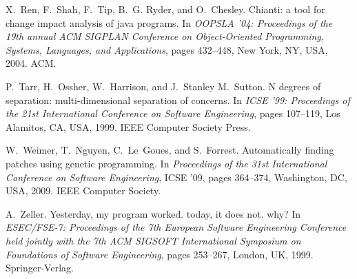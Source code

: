 {\begin{minipage}{0.9\textwidth}
X.~Ren, F.~Shah, F.~Tip, B.~G. Ryder, and O.~Chesley.
\newblock Chianti: a tool for change impact analysis of java programs.
\newblock In {\em OOPSLA '04: Proceedings of the 19th annual ACM SIGPLAN
  Conference on Object-Oriented Programming, Systems, Languages, and
  Applications}, pages 432--448, New York, NY, USA, 2004. ACM.

P.~Tarr, H.~Ossher, W.~Harrison, and J.~Stanley M.~Sutton.
\newblock N degrees of separation: multi-dimensional separation of concerns.
\newblock In {\em ICSE '99: Proceedings of the 21st International Conference on
  Software Engineering}, pages 107--119, Los Alamitos, CA, USA, 1999. IEEE
  Computer Society Press.

W.~Weimer, T.~Nguyen, C.~Le~Goues, and S.~Forrest.
\newblock Automatically finding patches using genetic programming.
\newblock In {\em Proceedings of the 31st International Conference on Software
  Engineering}, ICSE '09, pages 364--374, Washington, DC, USA, 2009. IEEE
  Computer Society.

A.~Zeller.
\newblock Yesterday, my program worked. today, it does not. why?
\newblock In {\em ESEC/FSE-7: Proceedings of the 7th European Software
  Engineering Conference held jointly with the 7th ACM SIGSOFT International
  Symposium on Foundations of Software Engineering}, pages 253--267, London,
  UK, 1999. Springer-Verlag.

\end{minipage}}


